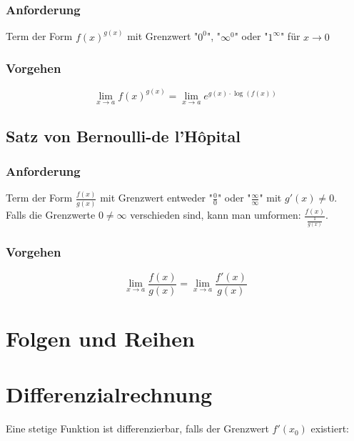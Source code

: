 \documentclass[11pt]{article}
\begin{document}
\subsubsection*{Anforderung}

Term der Form $f(x)^{g(x)}$ mit Grenzwert "$0^0$", "$\infty^0$" oder "$1^\infty$" für $x \to 0$

\subsubsection*{Vorgehen}

\begin{equation*}
	\lim_{x\to a}f(x)^{g(x)} = \lim_{x\to a}e^{g(x) \cdot \log(f(x))}
\end{equation*}

\subsection{Satz von Bernoulli-de l'H{\^o}pital}

\subsubsection*{Anforderung}

Term der Form $\frac{f(x)}{g(x)}$ mit Grenzwert entweder "$\frac{0}{0}$" oder "$\frac{\infty}{\infty}$" mit $g'(x) \neq 0$. \\
Falls die Grenzwerte $0 \neq \infty$ verschieden sind, kann man umformen: $\frac{f(x)}{\frac{1}{g(x)}}$.

\subsubsection*{Vorgehen}

\begin{equation*}
	\lim_{x\to a}\frac{f(x)}{g(x)} = \lim_{x\to a}\frac{f'(x)}{g(x)}
\end{equation*}

\section{Folgen und Reihen}

\section{Differenzialrechnung}

Eine stetige Funktion ist differenzierbar, falls der Grenzwert $f'(x_0)$ existiert:
\end{document}
